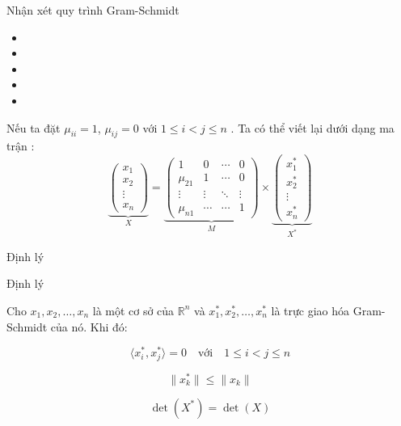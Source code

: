 \begin{frame}{Nhận xét quy trình Gram-Schmidt}

\begin{itemize}
\item
\item
\item
\item
\item
\end{itemize}


Nếu ta đặt $\mu_{ii} = 1 $, $\mu_{ij} = 0$ với $ 1\leq i < j \leq n$ . Ta có thể viết lại dưới dạng ma trận  :
$$\underbrace{\left(\begin{array}{c}
x_1\\
x_2\\
\vdots\\
x_n
\end{array}\right)}_{X} = \underbrace{\left(\begin{array}{cccc}
1 & 0 &\cdots & 0\\
\mu_{21} & 1 &\cdots & 0\\
\vdots & \vdots & \ddots &\vdots\\
\mu_{n1} &\cdots & \cdots & 1
\end{array}\right)}_{M} \times \underbrace{\left(\begin{array}{c}
x_1^*\\
x_2^*\\
\vdots\\
x_n^*
\end{array}\right)}_{X^*} $$

\end{frame}
\begin{frame}{Định lý}

\begin{block}{Định lý}

Cho $x_1, x_2, \ldots, x_n$ là một cơ sở của $\mathbb{R}^n$
và $x_1^*, x_2^*, \ldots, x_n^*$ là trực giao hóa Gram-Schmidt của nó. Khi đó:

\begin{equation} \label{equation:dinh_li_Gram-Schmidt1}
\langle x_i^*, x_j^* \rangle = 0 \quad \text{với} \quad 1 \leq i < j \leq n
\end{equation}

\begin{equation} \label{equation:dinh_li_Gram-Schmidt2}
\|x_k^*\| \leq \|x_k\|
\end{equation}

\begin{equation} \label{equation:dinh_li_Gram-Schmidt3}
\det(X^*) = \det(X)
\end{equation}

\end{block}

\end{frame}
